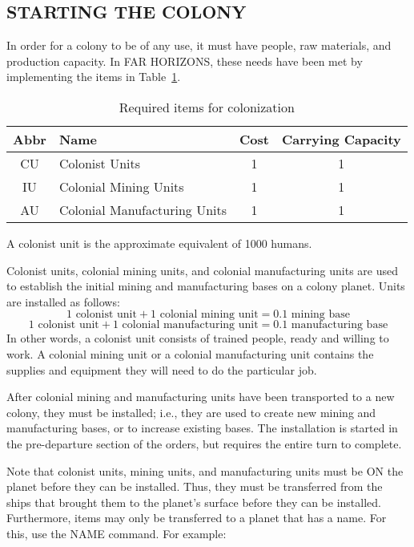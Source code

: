 \documentclass[10pt,titlepage]{article}
\begin{document}
\subsection{STARTING THE COLONY}
\label{sec:startingthecolony}


In order for a colony to be of any use, it must have people, raw materials,
and production capacity.  In FAR HORIZONS, these needs have been met by
implementing the items in Table~\ref{tab:coloitems}.

\begin{table}[h]
\begin{center}
\begin{tabular}{|clcc|}
\hline
\rowcolor{lightblue} \textbf{Abbr} &    \textbf{Name}  & Cost & Carrying Capacity \\
\hline
        CU  &    Colonist Units                &  1    &   1 \\
        IU  &    Colonial Mining Units         &  1    &   1 \\
        AU  &    Colonial Manufacturing Units  &  1    &   1 \\
\hline
\end{tabular}
\caption{Required items for colonization}
\label{tab:coloitems}
\end{center}
\end{table}

A colonist unit is the approximate equivalent of 1000 humans.

Colonist units, colonial mining units, and colonial manufacturing units are
used to establish the initial mining and manufacturing bases on a colony
planet.  Units are installed as follows:
\[
    1 \text{ colonist unit} + 1 \textrm{ colonial mining unit} = 0.1 \textrm{ mining base}
\]
\[
    1 \textrm{ colonist unit} + 1 \textrm{ colonial manufacturing unit} = 0.1 \textrm{ manufacturing base}
\]
In other words, a colonist unit consists of trained people, ready and willing
to work.  A colonial mining unit or a colonial manufacturing unit contains the
supplies and equipment they will need to do the particular job.

After colonial mining and manufacturing units have been transported to a new
colony, they must be installed; i.e., they are used to create new mining and
manufacturing bases, or to increase existing bases.  The installation is
started in the pre-departure section of the orders, but requires the entire
turn to complete.

Note that colonist units, mining units, and manufacturing units must be ON the
planet before they can be installed.  Thus, they must be transferred from the
ships that brought them to the planet's surface before they can be installed.
Furthermore, items may only be transferred to a planet that has a name.  For
this, use the NAME command.  For example:
\end{document}
